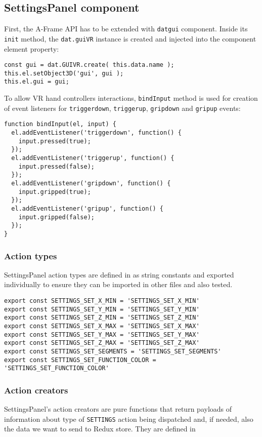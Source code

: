 \subsection{SettingsPanel component}
First, the A-Frame API has to be extended with \texttt{datgui} component. Inside its \texttt{init} method, the \texttt{dat.guiVR} instance is created and injected into the component element property:

\begin{lstlisting}
const gui = dat.GUIVR.create( this.data.name );
this.el.setObject3D('gui', gui );
this.el.gui = gui;
\end{lstlisting}

To allow VR hand controllers interactions, \texttt{bindInput} method is used for creation of event listeners for \texttt{triggerdown}, \texttt{triggerup}, \texttt{gripdown} and \texttt{gripup} events:

\begin{lstlisting}
function bindInput(el, input) {
  el.addEventListener('triggerdown', function() {
    input.pressed(true);
  });
  el.addEventListener('triggerup', function() {
    input.pressed(false);
  });
  el.addEventListener('gripdown', function() {
    input.gripped(true);
  });
  el.addEventListener('gripup', function() {
    input.gripped(false);
  });
}
\end{lstlisting}

\subsubsection{Action types}
SettingsPanel action types are defined in  as string constants and exported individually to ensure they can be imported in other files and also tested.

\begin{lstlisting}[caption={\texttt{settings} action types.},captionpos=b]
export const SETTINGS_SET_X_MIN = 'SETTINGS_SET_X_MIN'
export const SETTINGS_SET_Y_MIN = 'SETTINGS_SET_Y_MIN'
export const SETTINGS_SET_Z_MIN = 'SETTINGS_SET_Z_MIN'
export const SETTINGS_SET_X_MAX = 'SETTINGS_SET_X_MAX'
export const SETTINGS_SET_Y_MAX = 'SETTINGS_SET_Y_MAX'
export const SETTINGS_SET_Z_MAX = 'SETTINGS_SET_Z_MAX'
export const SETTINGS_SET_SEGMENTS = 'SETTINGS_SET_SEGMENTS'
export const SETTINGS_SET_FUNCTION_COLOR = 'SETTINGS_SET_FUNCTION_COLOR'
\end{lstlisting}

\subsubsection{Action creators}
SettingsPanel's action creators are pure functions that return payloads of information about type of \texttt{SETTINGS} action being dispatched and, if needed, also the data we want to send to Redux store. They are defined in 

